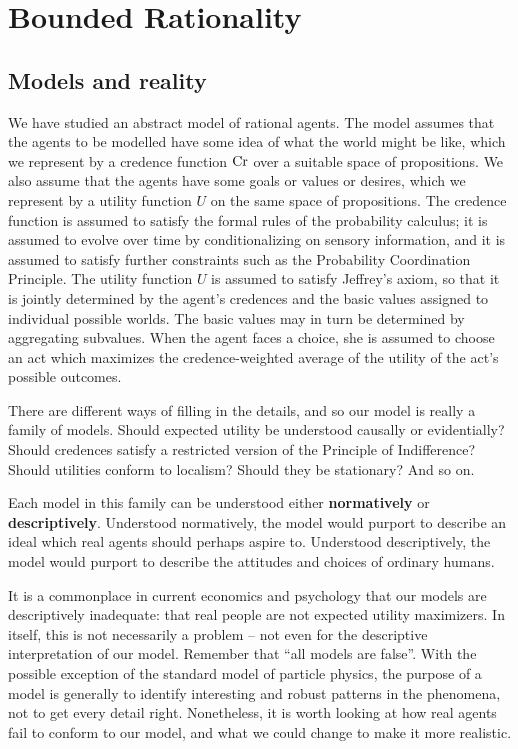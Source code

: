 \chapter{Bounded Rationality}

\section{Models and reality}

We have studied an abstract model of rational agents. The model
assumes that the agents to be modelled have some idea of what the
world might be like, which we represent by a credence function $\text{Cr}$
over a suitable space of propositions. We also assume that the agents
have some goals or values or desires, which we represent by a utility
function $U$ on the same space of propositions. The credence function
is assumed to satisfy the formal rules of the probability calculus; it
is assumed to evolve over time by conditionalizing on sensory
information, and it is assumed to satisfy further constraints such as
the Probability Coordination Principle. The utility function $U$ is
assumed to satisfy Jeffrey's axiom, so that it is jointly determined
by the agent's credences and the basic values assigned to individual
possible worlds. The basic values may in turn be determined by
aggregating subvalues. When the agent faces a choice, she is assumed
to choose an act which maximizes the credence-weighted average of the
utility of the act's possible outcomes.

There are different ways of filling in the details, and so our model
is really a family of models. Should expected utility be understood
causally or evidentially? Should credences satisfy a restricted
version of the Principle of Indifference? Should utilities conform to
localism?  Should they be stationary? And so on.

Each model in this family can be understood either
\textbf{normatively} or \textbf{descriptively}. Understood
normatively, the model would purport to describe an ideal which real
agents should perhaps aspire to. Understood descriptively, the model
would purport to describe the attitudes and choices of ordinary
humans.

It is a commonplace in current economics and psychology that our
models are descriptively inadequate: that real people are not expected
utility maximizers. In itself, this is not necessarily a problem --
not even for the descriptive interpretation of our model. Remember
that ``all models are false''. With the possible exception of the
standard model of particle physics, the purpose of a model is
generally to identify interesting and robust patterns in the
phenomena, not to get every detail right.  Nonetheless, it is worth
looking at how real agents fail to conform to our model, and what we
could change to make it more realistic.

